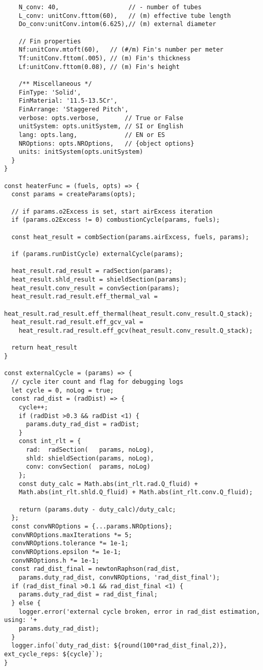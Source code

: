 \begin{verbatim}
    N_conv: 40,                   // - number of tubes 
    L_conv: unitConv.fttom(60),   // (m) effective tube length
    Do_conv:unitConv.intom(6.625),// (m) external diameter 

    // Fin properties
    Nf:unitConv.mtoft(60),   // (#/m) Fin's number per meter
    Tf:unitConv.fttom(.005), // (m) Fin's thickness
    Lf:unitConv.fttom(0.08), // (m) Fin's height

    /** Miscellaneous */
    FinType: 'Solid',
    FinMaterial: '11.5-13.5Cr',
    FinArrange: 'Staggered Pitch',
    verbose: opts.verbose,       // True or False
    unitSystem: opts.unitSystem, // SI or English
    lang: opts.lang,             // EN or ES
    NROptions: opts.NROptions,   // {object options}
    units: initSystem(opts.unitSystem)
  }
}

const heaterFunc = (fuels, opts) => {
  const params = createParams(opts);

  // if params.o2Excess is set, start airExcess iteration
  if (params.o2Excess != 0) combustionCycle(params, fuels);

  const heat_result = combSection(params.airExcess, fuels, params);

  if (params.runDistCycle) externalCycle(params);

  heat_result.rad_result = radSection(params);
  heat_result.shld_result = shieldSection(params);
  heat_result.conv_result = convSection(params);
  heat_result.rad_result.eff_thermal_val = 
    heat_result.rad_result.eff_thermal(heat_result.conv_result.Q_stack);
  heat_result.rad_result.eff_gcv_val = 
    heat_result.rad_result.eff_gcv(heat_result.conv_result.Q_stack);

  return heat_result
}

const externalCycle = (params) => {
  // cycle iter count and flag for debugging logs 
  let cycle = 0, noLog = true;
  const rad_dist = (radDist) => {
    cycle++;
    if (radDist >0.3 && radDist <1) {
      params.duty_rad_dist = radDist;
    }
    const int_rlt = {
      rad:  radSection(   params, noLog),
      shld: shieldSection(params, noLog),
      conv: convSection(  params, noLog)
    };
    const duty_calc = Math.abs(int_rlt.rad.Q_fluid) + 
    Math.abs(int_rlt.shld.Q_fluid) + Math.abs(int_rlt.conv.Q_fluid);

    return (params.duty - duty_calc)/duty_calc;
  };
  const convNROptions = {...params.NROptions};
  convNROptions.maxIterations *= 5;
  convNROptions.tolerance *= 1e-1;
  convNROptions.epsilon *= 1e-1;
  convNROptions.h *= 1e-1;
  const rad_dist_final = newtonRaphson(rad_dist, 
    params.duty_rad_dist, convNROptions, 'rad_dist_final');
  if (rad_dist_final >0.1 && rad_dist_final <1) { 
    params.duty_rad_dist = rad_dist_final; 
  } else {
    logger.error('external cycle broken, error in rad_dist estimation, using: '+
    params.duty_rad_dist);
  }
  logger.info(`duty_rad_dist: ${round(100*rad_dist_final,2)}, ext_cycle_reps: ${cycle}`);
}


\end{verbatim}
